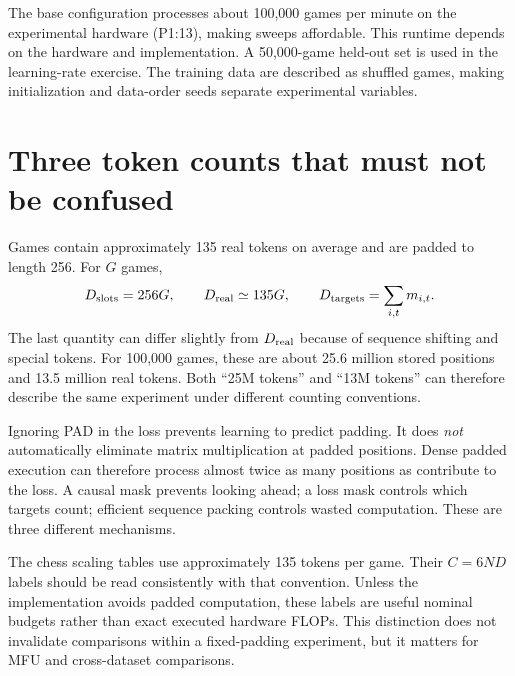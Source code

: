The base configuration processes about 100,000 games per minute on the experimental hardware (P1:13), making sweeps affordable. This runtime depends on the hardware and implementation. A 50,000-game held-out set is used in the learning-rate exercise. The training data are described as shuffled games, making initialization and data-order seeds separate experimental variables.


\section{Three token counts that must not be confused}\label{sec:tokens}
Games contain approximately 135 real tokens on average and are padded to length 256. For $G$ games,
\begin{equation}
 D_{\rm slots}=256G,\qquad D_{\rm real}\simeq135G,\qquad
 D_{\rm targets}=\sum_{i,t}m_{i,t}.
\end{equation}
The last quantity can differ slightly from $D_{\rm real}$ because of sequence shifting and special tokens. For 100,000 games, these are about 25.6 million stored positions and 13.5 million real tokens. Both ``25M tokens'' and ``13M tokens'' can therefore describe the same experiment under different counting conventions.

Ignoring PAD in the loss prevents learning to predict padding. It does \emph{not} automatically eliminate matrix multiplication at padded positions. Dense padded execution can therefore process almost twice as many positions as contribute to the loss. A causal mask prevents looking ahead; a loss mask controls which targets count; efficient sequence packing controls wasted computation. These are three different mechanisms.

The chess scaling tables use approximately 135 tokens per game. Their $C=6ND$ labels should be read consistently with that convention. Unless the implementation avoids padded computation, these labels are useful nominal budgets rather than exact executed hardware FLOPs. This distinction does not invalidate comparisons within a fixed-padding experiment, but it matters for MFU and cross-dataset comparisons.

\FloatBarrier
